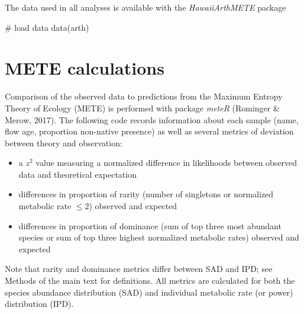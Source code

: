 \documentclass[
  letterpaper,
  DIV=11,
  numbers=noendperiod]{scrartcl}
\newenvironment{Shaded}{\begin{snugshade}}{\end{snugshade}}
\newcommand{\CommentTok}[1]{\textcolor[rgb]{0.37,0.37,0.37}{#1}}
\newcommand{\FunctionTok}[1]{\textcolor[rgb]{0.28,0.35,0.67}{#1}}
\newcommand{\NormalTok}[1]{\textcolor[rgb]{0.00,0.23,0.31}{#1}}
\providecommand{\tightlist}{%
  \setlength{\itemsep}{0pt}\setlength{\parskip}{0pt}}
\begin{document}
The data used in all analyses is available with the
\emph{HawaiiArthMETE} package

\begin{Shaded}
\begin{Highlighting}[]
\CommentTok{\# load data }
\FunctionTok{data}\NormalTok{(arth)}
\end{Highlighting}
\end{Shaded}

\section{METE calculations}\label{mete-calculations}

Comparison of the observed data to predictions from the Maximum Entropy
Theory of Ecology (METE) is performed with package \emph{meteR}
(Rominger \& Merow, 2017). The following code records information about
each sample (name, flow age, proportion non-native presence) as well as
several metrics of deviation between theory and observation:

\begin{itemize}
\tightlist
\item
  a \(z^2\) value measuring a normalized difference in likelihoods
  between observed data and theoretical expectation
\item
  differences in proportion of rarity (number of singletons or
  normalized metabolic rate \(\leq 2\)) observed and expected
\item
  differences in proportion of dominance (sum of top three most abundant
  species or sum of top three highest normalized metabolic rates)
  observed and expected
\end{itemize}

Note that rarity and dominance metrics differ between SAD and IPD; see
Methods of the main text for definitions. All metrics are calculated for
both the species abundance distribution (SAD) and individual metabolic
rate (or power) distribution (IPD).
\end{document}
